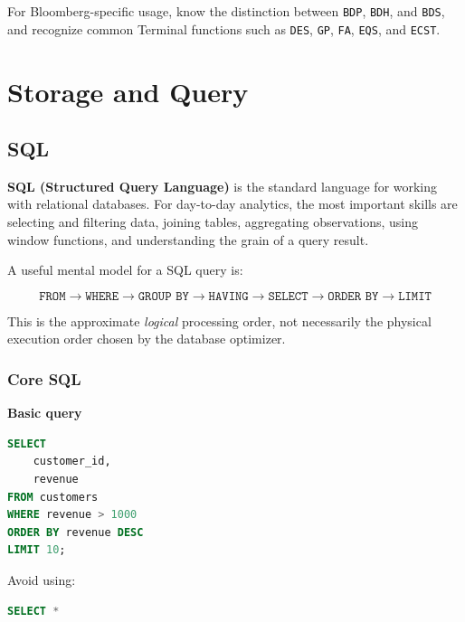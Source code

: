 \documentclass[11pt,letterpaper]{article}
\begin{document}
For Bloomberg-specific usage, know the distinction between
\texttt{BDP}, \texttt{BDH}, and \texttt{BDS}, and recognize common Terminal
functions such as \texttt{DES}, \texttt{GP}, \texttt{FA}, \texttt{EQS}, and
\texttt{ECST}.



\section{Storage and Query}


\subsection{SQL}

\textbf{SQL (Structured Query Language)} is the standard language for working
with relational databases. For day-to-day analytics, the most important skills
are selecting and filtering data, joining tables, aggregating observations,
using window functions, and understanding the grain of a query result.

A useful mental model for a SQL query is:

\[
\texttt{FROM}
\rightarrow
\texttt{WHERE}
\rightarrow
\texttt{GROUP BY}
\rightarrow
\texttt{HAVING}
\rightarrow
\texttt{SELECT}
\rightarrow
\texttt{ORDER BY}
\rightarrow
\texttt{LIMIT}
\]

This is the approximate \emph{logical} processing order, not necessarily the
physical execution order chosen by the database optimizer.


\subsubsection{Core SQL}

\textbf{Basic query}

\begin{lstlisting}[language=SQL]
SELECT
    customer_id,
    revenue
FROM customers
WHERE revenue > 1000
ORDER BY revenue DESC
LIMIT 10;
\end{lstlisting}

Avoid using:

\begin{lstlisting}[language=SQL]
SELECT *
\end{lstlisting}
\end{document}
